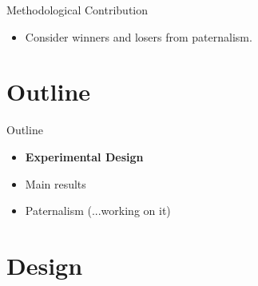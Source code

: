 \documentclass[8pt]{beamer}
\begin{document}
\begin{frame}{Methodological Contribution}
\begin{itemize}
    
   \vfill  \item Consider winners and losers from paternalism.     

    
  


\end{itemize}
\end{frame}




\section{Outline}
\begin{frame}{Outline}
     \begin{itemize}
         \vfill\item \textbf{Experimental Design}
         \vfill\item Main results
         \vfill\item Paternalism (...working on it)
     \end{itemize}
\end{frame}







\section{Design}
\end{document}
